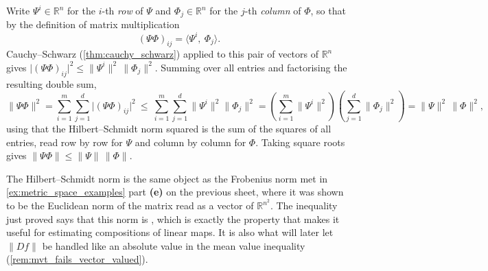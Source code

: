 \begin{exercisesolution}
\label{sol:hilbert_schmidt_submultiplicative}
Write $\Psi^i \in \mathbb{R}^n$ for the $i$-th \emph{row} of $\Psi$ and
$\Phi_j \in \mathbb{R}^n$ for the $j$-th \emph{column} of $\Phi$, so that by the definition of
matrix multiplication
\[(\Psi\Phi)_{ij} = \langle \Psi^i,\ \Phi_j\rangle.\]
Cauchy--Schwarz (\cref{thm:cauchy_schwarz}) applied to this pair of vectors of $\mathbb{R}^n$
gives $\big|(\Psi\Phi)_{ij}\big|^2 \leq \lVert\Psi^i\rVert^2\,\lVert\Phi_j\rVert^2$. Summing over
all entries and factorising the resulting double sum,
\[\lVert\Psi\Phi\rVert^2
  = \sum_{i=1}^m\sum_{j=1}^d \big|(\Psi\Phi)_{ij}\big|^2
  \ \leq\ \sum_{i=1}^m\sum_{j=1}^d \lVert\Psi^i\rVert^2\lVert\Phi_j\rVert^2
  = \left(\sum_{i=1}^m\lVert\Psi^i\rVert^2\right)\left(\sum_{j=1}^d\lVert\Phi_j\rVert^2\right)
  = \lVert\Psi\rVert^2\,\lVert\Phi\rVert^2,\]
using that the Hilbert--Schmidt norm squared is the sum of the squares of all entries, read
row by row for $\Psi$ and column by column for $\Phi$. Taking square roots gives
$\lVert\Psi\Phi\rVert \leq \lVert\Psi\rVert\,\lVert\Phi\rVert$.

\begin{remark}
The Hilbert--Schmidt norm is the same object as the Frobenius norm met in
\cref{ex:metric_space_examples} part \textbf{(e)} on the previous sheet, where it was shown to be the Euclidean
norm of the
matrix read as a vector of $\mathbb{R}^{n^2}$. The inequality just proved says that this norm is
 , which is exactly the property that
makes it useful for estimating compositions of linear maps. It is also what will later let
$\lVert Df\rVert$ be handled like an absolute value in the mean value inequality
(\cref{rem:mvt_fails_vector_valued}).
\end{remark}
\end{exercisesolution}

